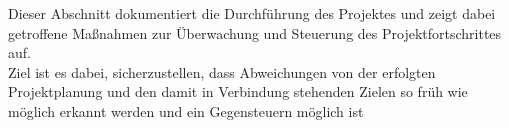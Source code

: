 \documentclass[ThesisDJ.tex]{subfiles}
\begin{document}
    Dieser Abschnitt dokumentiert die Durchführung des Projektes und zeigt dabei getroffene Maßnahmen zur Überwachung und Steuerung des Projektfortschrittes auf.\\
    Ziel ist es dabei, sicherzustellen, dass Abweichungen von der erfolgten Projektplanung und den damit in Verbindung stehenden Zielen so früh wie möglich erkannt 
    werden und ein Gegensteuern möglich ist \cite[S.~55ff]{riedl_management_2019}

    \subsection{}
\end{document}
